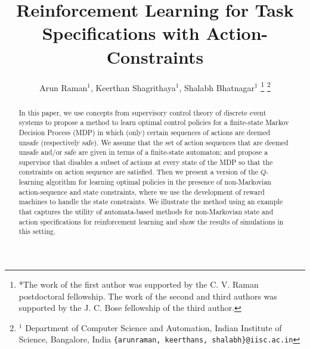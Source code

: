 \documentclass[letterpaper, 10 pt, conference]{ieeeconf}
\title{\LARGE \bf Reinforcement Learning for Task Specifications with Action-Constraints}
\author{Arun Raman$^{1}$, Keerthan Shagrithaya$^{1}$, Shalabh Bhatnagar$^{1}$%
\thanks{*The work of the first author was supported by the C. V. Raman postdoctoral fellowship. The work of the second and third authors was supported by the J. C. Bose fellowship of the third author.}%
\thanks{$^{1}$ Department of Computer Science and Automation, Indian Institute of Science, Bangalore, India
        {\tt\small\{arunraman, keerthans, shalabh\}@iisc.ac.in}}%
}
\begin{document}
\maketitle
\begin{abstract}



In this paper, we use concepts from supervisory control theory of discrete event systems to propose a method to learn optimal control policies for a finite-state Markov Decision Process (MDP) in which (only) certain sequences of actions are deemed unsafe (respectively safe). We assume that the set of action sequences that are deemed unsafe and/or safe are given in terms of a finite-state automaton; and propose a supervisor that disables a subset of actions at every state of the MDP so that the constraints on action sequence are satisfied. Then we present a version of the $Q$-learning algorithm for learning optimal policies in the presence of non-Markovian action-sequence and state constraints, where we use the development of reward machines to handle the state constraints. We illustrate the method using an example that captures the utility of automata-based methods for non-Markovian state and action specifications for reinforcement learning and show the results of simulations in this setting. 


\end{abstract}
\end{document}
